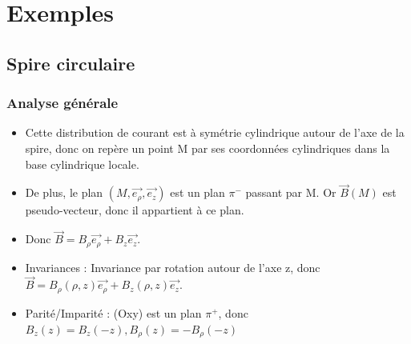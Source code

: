\documentclass[french]{yLectureNote}
\renewcommand{\vec}{\overrightarrow}
\newcommand{\norm}[1]{||\vec{#1}||}
\newcommand{\B}{\vec{B}(M)}
\newcommand{\er}{\vec{e_{\rho}}}
\newcommand{\pip}{\pi^+}
\newcommand{\pim}{\pi^-}
\begin{document}
%
%
%
%
\section{Exemples}
\subsection{Spire circulaire}
\subsubsection{Analyse générale}
\begin{itemize}
 \item Cette distribution de courant est à symétrie cylindrique autour de l'axe de la spire, donc on repère un point M par ses coordonnées cylindriques dans la base cylindrique locale.
 \item De plus, le plan \((M, \er, \vec{e_z})\) est un plan \(\pim\) passant par M. Or \(\B\) est pseudo-vecteur, donc il appartient à ce plan.
 \item Donc \(\vec{B} = B_{\rho}\er + B_z \vec{e_z}\).
 \item Invariances : Invariance par rotation autour de l'axe z, donc \(\vec{B} = B_{\rho}(\rho, z)\er + B_z(\rho, z) \vec{e_z}\).
\item Parité/Imparité : (Oxy) est un plan \(\pip\), donc \(B_z(z) = B_z(-z), B_{\rho}(z) = -B_{\rho}(-z)\)
\end{itemize}
\end{document}
